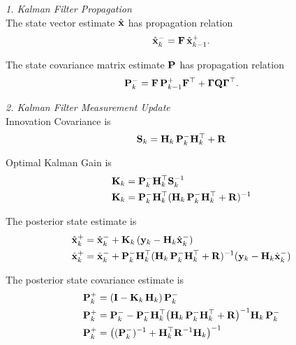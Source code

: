 \newline \newline
\textit{1. Kalman Filter Propagation}\\
The state vector estimate $\hat{\mathbf{x}}$ has propagation relation
\begin{equation}
	\hat{\mathbf{x}}_{k}^- = \mathbf{F} \, \hat{\mathbf{x}}_{k-1}^+.
\end{equation}

\noindent
The state covariance matrix estimate $\mathbf{P}$ has propagation relation
\begin{equation}
	\mathbf{P}_{k}^- = \mathbf{F} \, \mathbf{P}_{k-1}^+ \mathbf{F}^\top + \boldsymbol{\Gamma} \mathbf{Q} \boldsymbol{\Gamma}^\top.
\end{equation}

\noindent
\textit{2. Kalman Filter Measurement Update} \\
Innovation Covariance is 
\begin{equation}
	\mathbf{S}_k = \mathbf{H}_k \, \mathbf{P}^-_k \mathbf{H}_k^\top + \mathbf{R}
\end{equation}

Optimal Kalman Gain is
\begin{align}
	\mathbf{K}_k &= \mathbf{P}_k^- \mathbf{H}_k^\top \mathbf{S}_k^{-1} \nonumber \\
	\mathbf{K}_k &= \mathbf{P}_k^- \mathbf{H}_k^\top (\mathbf{H}_k \, \mathbf{P}_k^- \mathbf{H}_k^\top + \mathbf{R})^{-1}
\end{align}

The posterior state estimate is
\begin{align}
	\hat{\mathbf{x}}_k^+ &= \hat{\mathbf{x}}_k^- + \mathbf{K}_k \, (\mathbf{y}_k - \mathbf{H}_k \hat{\mathbf{x}}_k^-) \nonumber \\
	\hat{\mathbf{x}}_k^+ &= \hat{\mathbf{x}}_k^- + \mathbf{P}_k^- \mathbf{H}_k^\top (\mathbf{H}_k \, \mathbf{P}_k^- \mathbf{H}_k^\top + \mathbf{R})^{-1} (\mathbf{y}_k - \mathbf{H}_k \hat{\mathbf{x}}_k^-)
\end{align}

The posterior state covariance estimate is
\begin{align}
	\mathbf{P}_k^+ &= (\mathbf{I} - \mathbf{K}_k \, \mathbf{H}_k) \, \mathbf{P}_k^- \nonumber \\
	\mathbf{P}_k^+ &= \mathbf{P}_k^- - \mathbf{P}_k^- \mathbf{H}_k^\top \big(\mathbf{H}_k \, \mathbf{P}_k^- \mathbf{H}_k^\top + \mathbf{R} \big)^{-1} \mathbf{H}_k \, \mathbf{P}_k^- \nonumber \\
	\mathbf{P}_k^+ &= \big((\mathbf{P}_k^-)^{-1} + \mathbf{H}_k^\top \mathbf{R}^{-1} \mathbf{H}_k \big)^{-1}
\end{align}
